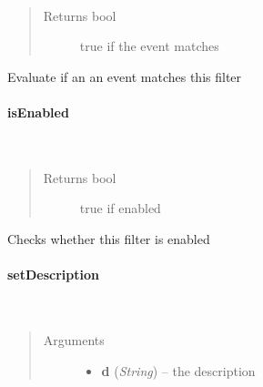 \documentclass[letterpaper,10pt,english]{sphinxmanual}
\begin{document}
\begin{fulllineitems}
\label{ambrosia_web.filter.Filter:ambrosia_web.filter.Filter.evaluate}~\begin{quote}\begin{description}
\item[{Returns bool}] \leavevmode
true if the event matches

\end{description}\end{quote}

\end{fulllineitems}


Evaluate if an an event matches this filter


\paragraph{isEnabled}
\label{ambrosia_web.filter.Filter:isenabled}

\begin{fulllineitems}
\label{ambrosia_web.filter.Filter:ambrosia_web.filter.Filter.isEnabled}~\begin{quote}\begin{description}
\item[{Returns bool}] \leavevmode
true if enabled

\end{description}\end{quote}

\end{fulllineitems}


Checks whether this filter is enabled


\paragraph{setDescription}
\label{ambrosia_web.filter.Filter:setdescription}

\begin{fulllineitems}
\label{ambrosia_web.filter.Filter:ambrosia_web.filter.Filter.setDescription}~\begin{quote}\begin{description}
\item[{Arguments}] \leavevmode\begin{itemize}
\item {} 
\textbf{d} (\emph{String}) -- the description

\end{itemize}

\end{description}\end{quote}

\end{fulllineitems}
\end{document}
